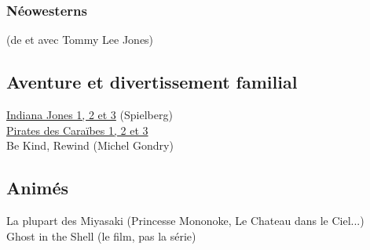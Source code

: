 \subsubsection{Néowesterns}
(de et avec Tommy Lee Jones) \\

\subsection{Aventure et divertissement familial}
\href{https://www.rottentomatoes.com/search/?search=indiana+jones&sitesearch=rt}{Indiana Jones 1, 2 et 3}
(Spielberg) \\
\href{https://www.rottentomatoes.com/search/?search=pirates+of+the+caribbean&sitesearch=rt}{Pirates des Caraïbes 1, 2 et 3} \\
Be Kind, Rewind (Michel Gondry) \\

\subsection{Animés}
La plupart des Miyasaki (Princesse Mononoke, Le Chateau dans le Ciel...)\\
Ghost in the Shell (le film, pas la série)\\

